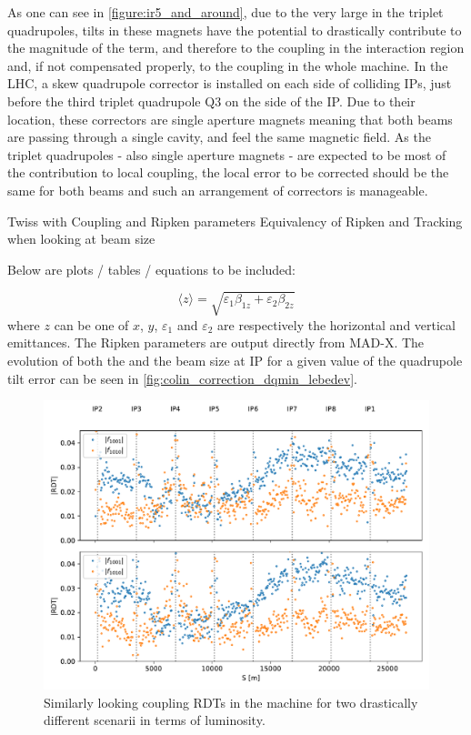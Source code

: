 As one can see in \cref{figure:ir5_and_around}, due to the very large \betafunctions in the triplet quadrupoles, tilts in these magnets have the potential to drastically contribute to the magnitude of the \foneohone term, and therefore to the coupling in the interaction region and, if not compensated properly, to the coupling in the whole machine.
In the LHC, a skew quadrupole corrector is installed on each side of colliding IPs, just before the third triplet quadrupole \(\mathrm{Q3}\) on the side of the IP.
Due to their location, these correctors are single aperture magnets meaning that both beams are passing through a single cavity, and feel the same magnetic field.
As the triplet quadrupoles - also single aperture magnets - are expected to be most of the contribution to local coupling, the local error to be corrected should be the same for both beams and such an arrangement of correctors is manageable.


Twiss with Coupling and Ripken parameters
Equivalency of Ripken and Tracking when looking at beam size

Below are plots / tables / equations to be included:

\begin{equation}
    \langle z \rangle = \sqrt{\varepsilon_{1} \beta_{1z} + \varepsilon_{2} \beta_{2z}}
    \label{equation:lebedev_beam_size}
\end{equation}
where $z$ can be one of $x$, $y$, $\varepsilon_{1}$ and $\varepsilon_{2}$ are respectively the horizontal and vertical emittances.
The Ripken parameters are output directly from MAD-X.
The evolution of both the \AbsCminus and the beam size at IP for a given value of the quadrupole tilt error can be seen in \cref{fig:colin_correction_dqmin_lebedev}.

\begin{figure}
    \centering
    \includegraphics*[width=0.9\linewidth]{Figures/Chapter4/guess_rdts.pdf}
    \caption{Similarly looking coupling RDTs in the machine for two drastically different scenarii in terms of luminosity.}
    \label{figure:guess_rdts}
\end{figure}

